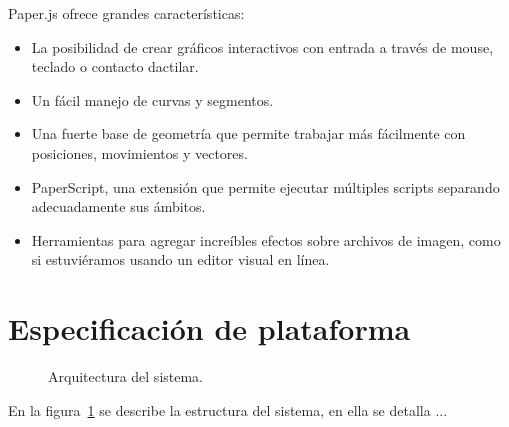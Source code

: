 Paper.js ofrece grandes características:
\begin{itemize}
\item La posibilidad de crear gráficos interactivos con entrada a través de mouse, teclado o contacto dactilar. 

\item Un fácil manejo de curvas y segmentos. 

\item Una fuerte base de geometría que permite trabajar más fácilmente con posiciones, movimientos y vectores. 

\item PaperScript, una extensión que permite ejecutar múltiples scripts separando adecuadamente sus ámbitos. 

\item Herramientas para agregar increíbles efectos sobre archivos de imagen, como si estuviéramos usando un editor visual en línea.
\cite{paper}
\end{itemize}

\section{Especificación de plataforma}	


\begin{figure}[htbp!]
	\begin{center}
		\caption{Arquitectura del sistema.}
		\label{fig:arquitectura}
	\end{center}
\end{figure}

En la figura~\ref{fig:arquitectura} se describe la estructura del sistema, en ella se detalla ...


